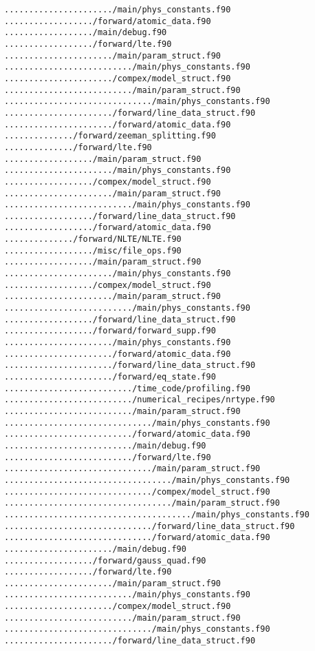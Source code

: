 \begin{verbatim}
....................../main/phys_constants.f90
................../forward/atomic_data.f90
................../main/debug.f90
................../forward/lte.f90
....................../main/param_struct.f90
........................../main/phys_constants.f90
....................../compex/model_struct.f90
........................../main/param_struct.f90
............................../main/phys_constants.f90
....................../forward/line_data_struct.f90
....................../forward/atomic_data.f90
............../forward/zeeman_splitting.f90
............../forward/lte.f90
................../main/param_struct.f90
....................../main/phys_constants.f90
................../compex/model_struct.f90
....................../main/param_struct.f90
........................../main/phys_constants.f90
................../forward/line_data_struct.f90
................../forward/atomic_data.f90
............../forward/NLTE/NLTE.f90
................../misc/file_ops.f90
................../main/param_struct.f90
....................../main/phys_constants.f90
................../compex/model_struct.f90
....................../main/param_struct.f90
........................../main/phys_constants.f90
................../forward/line_data_struct.f90
................../forward/forward_supp.f90
....................../main/phys_constants.f90
....................../forward/atomic_data.f90
....................../forward/line_data_struct.f90
....................../forward/eq_state.f90
........................../time_code/profiling.f90
........................../numerical_recipes/nrtype.f90
........................../main/param_struct.f90
............................../main/phys_constants.f90
........................../forward/atomic_data.f90
........................../main/debug.f90
........................../forward/lte.f90
............................../main/param_struct.f90
................................../main/phys_constants.f90
............................../compex/model_struct.f90
................................../main/param_struct.f90
....................................../main/phys_constants.f90
............................../forward/line_data_struct.f90
............................../forward/atomic_data.f90
....................../main/debug.f90
................../forward/gauss_quad.f90
................../forward/lte.f90
....................../main/param_struct.f90
........................../main/phys_constants.f90
....................../compex/model_struct.f90
........................../main/param_struct.f90
............................../main/phys_constants.f90
....................../forward/line_data_struct.f90

\end{verbatim}
